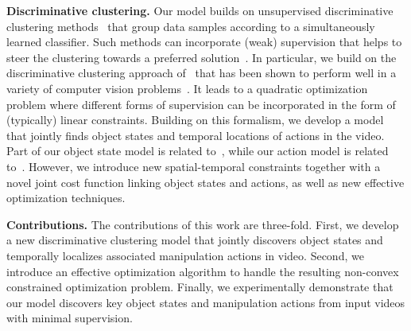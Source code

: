 \noindent\textbf{Discriminative clustering.}
Our model builds on unsupervised discriminative clustering methods~\cite{Bach07diffrac,singh12discPat,Xu2004maximum} that group data samples according to a simultaneously learned classifier. 
Such methods can incorporate (weak) supervision that helps to steer the clustering towards a preferred solution~\cite{Bojanowski13finding,doersch2012what,feifei2016connectionist,jain2013representing,tang14coloc}.
In particular, we build on the discriminative clustering approach of~\cite{Bach07diffrac} that has been shown to perform well in a variety of computer vision problems~\cite{Bojanowski13finding}. %
It leads to a quadratic optimization problem where different forms of supervision can be  incorporated in the form of (typically) linear constraints.
Building on this formalism, we develop a model that jointly finds object states and temporal locations of actions in the video.
Part of our object state model is related to~\cite{Joulin14efficient}, while our action model is related to~\cite{Bojanowski15weakly}.
However, we introduce new spatial-temporal constraints together with a novel joint cost function linking object states and actions, as well as new effective optimization techniques.  


\noindent\textbf{Contributions.}
\label{sec:contrib}
The contributions of this work are three-fold. 
First, we develop a new discriminative clustering model that jointly discovers object states and temporally localizes associated manipulation actions in video. 
Second, we introduce an effective optimization algorithm to handle the resulting non-convex constrained optimization problem. 
Finally, we experimentally demonstrate that our model discovers key object states and manipulation actions from input videos with minimal supervision.

